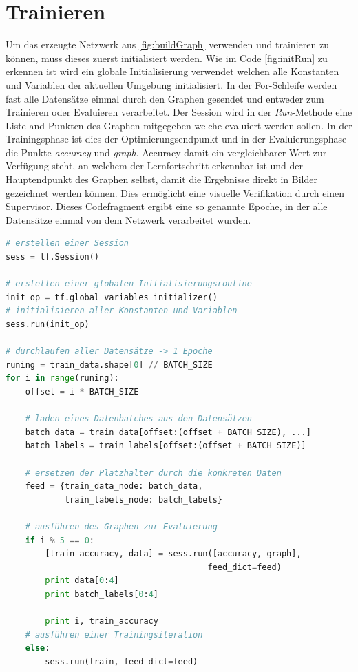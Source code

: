 \section{Trainieren}

Um das erzeugte Netzwerk aus \ref{fig:buildGraph} verwenden und trainieren zu können, muss dieses zuerst initialisiert werden. 
Wie im Code \ref{fig:initRun} zu erkennen ist wird ein globale Initialisierung verwendet welchen alle Konstanten und Variablen der aktuellen Umgebung initialisiert. 
In der For-Schleife werden fast alle Datensätze einmal durch den Graphen gesendet und entweder zum Trainieren oder Evaluieren verarbeitet. 
Der Session wird in der \textit{Run}-Methode eine Liste and Punkten des Graphen mitgegeben welche evaluiert werden sollen. 
In der Trainingsphase ist dies der Optimierungsendpunkt und in der Evaluierungsphase die Punkte \textit{accuracy} und \textit{graph}. 
Accuracy damit ein vergleichbarer Wert zur Verfügung steht, an welchem der Lernfortschritt erkennbar ist und der Hauptendpunkt des Graphen selbst, damit die Ergebnisse direkt in Bilder gezeichnet werden können. 
Dies ermöglicht eine visuelle Verifikation durch einen Supervisor. 
Dieses Codefragment ergibt eine so genannte Epoche, in der alle Datensätze einmal von dem Netzwerk verarbeitet wurden. 
\begin{lstlisting}[caption={Initialisierung des Graphen und durchführen einer Epoche},label=fig:initRun,captionpos=b,language=Python]
# erstellen einer Session
sess = tf.Session()

# erstellen einer globalen Initialisierungsroutine
init_op = tf.global_variables_initializer()
# initialisieren aller Konstanten und Variablen
sess.run(init_op)

# durchlaufen aller Datensätze -> 1 Epoche
runing = train_data.shape[0] // BATCH_SIZE
for i in range(runing):
    offset = i * BATCH_SIZE
    
    # laden eines Datenbatches aus den Datensätzen
    batch_data = train_data[offset:(offset + BATCH_SIZE), ...]
    batch_labels = train_labels[offset:(offset + BATCH_SIZE)]
    
    # ersetzen der Platzhalter durch die konkreten Daten
    feed = {train_data_node: batch_data, 
            train_labels_node: batch_labels}
     
    # ausführen des Graphen zur Evaluierung
    if i % 5 == 0:
        [train_accuracy, data] = sess.run([accuracy, graph], 
        								 feed_dict=feed)
        print data[0:4]
        print batch_labels[0:4]
        
        print i, train_accuracy
    # ausführen einer Trainingsiteration
    else:
        sess.run(train, feed_dict=feed)
\end{lstlisting}

